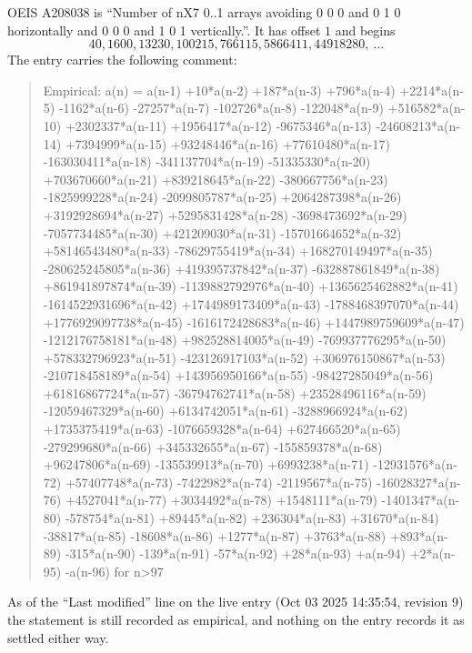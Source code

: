 \documentclass[11pt,a4paper]{article}
\theoremstyle{plain}
\theoremstyle{definition}
\begin{document}
OEIS A208038 is ``Number of nX7 0..1 arrays avoiding 0 0 0 and 0 1 0 horizontally and 0 0 0 and 1 0 1 vertically.''. It has offset
$1$ and begins
\[
40, 1600, 13230, 100215, 766115, 5866411, 44918280,\ \dots
\]
The entry carries the following comment:
\begin{quote}\small
Empirical: a(n) = a(n-1) +10*a(n-2) +187*a(n-3) +796*a(n-4) +2214*a(n-5) -1162*a(n-6) -27257*a(n-7) -102726*a(n-8) -122048*a(n-9) +516582*a(n-10) +2302337*a(n-11) +1956417*a(n-12) -9675346*a(n-13) -24608213*a(n-14) +7394999*a(n-15) +93248446*a(n-16) +77610480*a(n-17) -163030411*a(n-18) -341137704*a(n-19) -51335330*a(n-20) +703670660*a(n-21) +839218645*a(n-22) -380667756*a(n-23) -1825999228*a(n-24) -2099805787*a(n-25) +2064287398*a(n-26) +3192928694*a(n-27) +5295831428*a(n-28) -3698473692*a(n-29) -7057734485*a(n-30) +421209030*a(n-31) -15701664652*a(n-32) +58146543480*a(n-33) -78629755419*a(n-34) +168270149497*a(n-35) -280625245805*a(n-36) +419395737842*a(n-37) -632887861849*a(n-38) +861941897874*a(n-39) -1139882792976*a(n-40) +1365625462882*a(n-41) -1614522931696*a(n-42) +1744989173409*a(n-43) -1788468397070*a(n-44) +1776929097738*a(n-45) -1616172428683*a(n-46) +1447989759609*a(n-47) -1212176758181*a(n-48) +982528814005*a(n-49) -769937776295*a(n-50) +578332796923*a(n-51) -423126917103*a(n-52) +306976150867*a(n-53) -210718458189*a(n-54) +143956950166*a(n-55) -98427285049*a(n-56) +61816867724*a(n-57) -36794762741*a(n-58) +23528496116*a(n-59) -12059467329*a(n-60) +6134742051*a(n-61) -3288966924*a(n-62) +1735375419*a(n-63) -1076659328*a(n-64) +627466520*a(n-65) -279299680*a(n-66) +345332655*a(n-67) -155859378*a(n-68) +96247806*a(n-69) -135539913*a(n-70) +6993238*a(n-71) -12931576*a(n-72) +57407748*a(n-73) -7422982*a(n-74) -2119567*a(n-75) -16028327*a(n-76) +4527041*a(n-77) +3034492*a(n-78) +1548111*a(n-79) -1401347*a(n-80) -578754*a(n-81) +89445*a(n-82) +236304*a(n-83) +31670*a(n-84) -38817*a(n-85) -18608*a(n-86) +1277*a(n-87) +3763*a(n-88) +893*a(n-89) -315*a(n-90) -139*a(n-91) -57*a(n-92) +28*a(n-93) +a(n-94) +2*a(n-95) -a(n-96) for n>97
\end{quote}
As of the ``Last modified'' line on the live entry (Oct 03 2025 14:35:54, revision
9) the statement is still recorded as empirical, and nothing on the entry
records it as settled either way.
\end{document}
